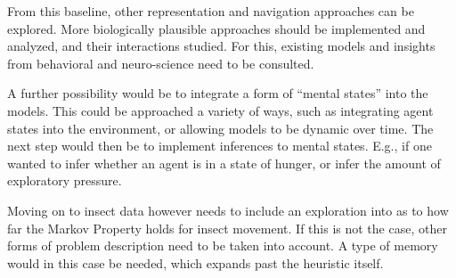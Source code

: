 From this baseline, other representation and navigation approaches can be explored.
More biologically plausible approaches should be implemented and analyzed, and their interactions studied. For this, existing models and insights from behavioral and neuro-science need to be consulted.

A further possibility would be to integrate a form of ``mental states'' into the models. This could be approached a variety of ways, such as integrating agent states into the environment, or allowing models to be dynamic over time.
The next step would then be to implement inferences to mental states.
E.g., if one wanted to infer whether an agent is in a state of hunger, or infer the amount of exploratory pressure.

Moving on to insect data however needs to include an exploration into as to how far the Markov Property holds for insect movement.
If this is not the case, other forms of problem description need to be taken into account.
A type of memory would in this case be needed, which expands past the heuristic itself.
